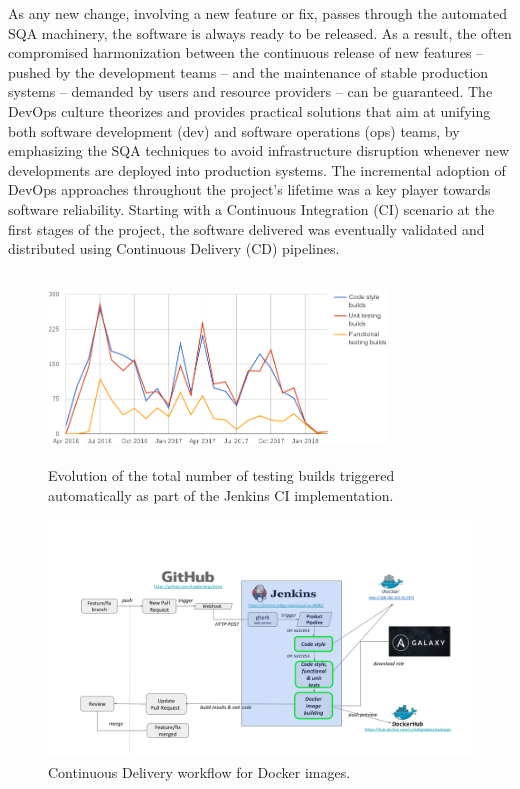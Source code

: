 As any new change, involving a new feature or fix, passes through the automated
SQA machinery, the software is always ready to be released. As a result, the often compromised harmonization
between the continuous release of new features -- pushed by the development teams -- and the maintenance of
stable production systems -- demanded by users and resource providers -- can be guaranteed. The DevOps culture
theorizes and provides practical solutions that aim at unifying both software development (dev) and software
operations (ops) teams, by emphasizing the SQA techniques to avoid infrastructure disruption whenever new
developments are deployed into production systems.
The incremental adoption of DevOps approaches throughout the project's lifetime was a key player towards
software reliability. Starting with a Continuous Integration (CI) scenario at the first stages of the project, the software delivered
was eventually validated and distributed using Continuous Delivery (CD) pipelines.

\begin{figure}[ht]
\centering
\includegraphics[width=0.8\textwidth, height=50mm]{images/jenkins_CI_builds.png}
\caption{Evolution of the total number of testing builds triggered automatically as part of the Jenkins CI implementation.}
\label{fig:fig_jenkins_CI_builds}
\end{figure}

\begin{figure}[ht]
\centering
\includegraphics[width=\textwidth]{images/devops.png}
\caption{Continuous Delivery workflow for Docker images.}
\label{fig:fig_CD}
\end{figure}


